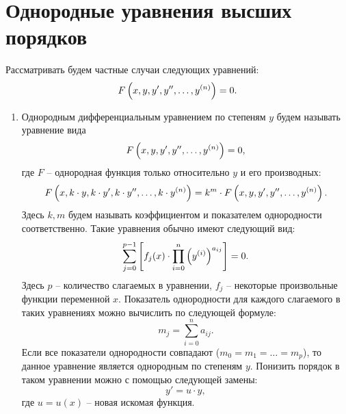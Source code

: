 \section{Однородные уравнения высших порядков}

	Рассматривать будем частные случаи следующих уравнений:
	\[ F\left( x, y, y', y'', \dots, y^{(n)} \right) = 0. \]
	
	\begin{enumerate}
		\item Однородным дифференциальным уравнением по степеням $ y $ будем называть уравнение вида
			\[ F\left( x, y, y', y'', \dots, y^{(n)} \right) = 0, \]
			где $F$ -- однородная функция только относительно $y$ и его производных:
			\[ F\left( x, k \cdot y, k \cdot y', k \cdot y'', \dots, k \cdot y^{(n)} \right) = k^m \cdot F \left( x, y, y', y'', \dots, y^{(n)} \right). \]
			Здесь $k, m$ будем называть коэффициентом и показателем однородности соответственно. Такие уравнения обычно имеют следующий вид:
			\[ \sum_{j = 0}^{p-1} \left[ f_j(x) \cdot \prod_{i=0}^{n} \left( y^{(i)} \right)^{a_{ij}} \right] = 0. \]
			Здесь $p$ -- количество слагаемых в уравнении, $f_j$ -- некоторые произвольные функции переменной $x$. Показатель однородности для каждого слагаемого в таких уравнениях можно вычислить по следующей формуле:
			\[ m_j = \sum_{i = 0}^n a_{ij}. \]
			Если все показатели однородности совпадают ($m_0 = m_1 = \dots = m_p$), то данное уравнение является однородным по степеням $y$. Понизить порядок в таком уравнении можно с помощью следующей замены:
			\[ y' = u \cdot y, \]
			где $u = u(x)$ -- новая искомая функция.


\end{enumerate}
